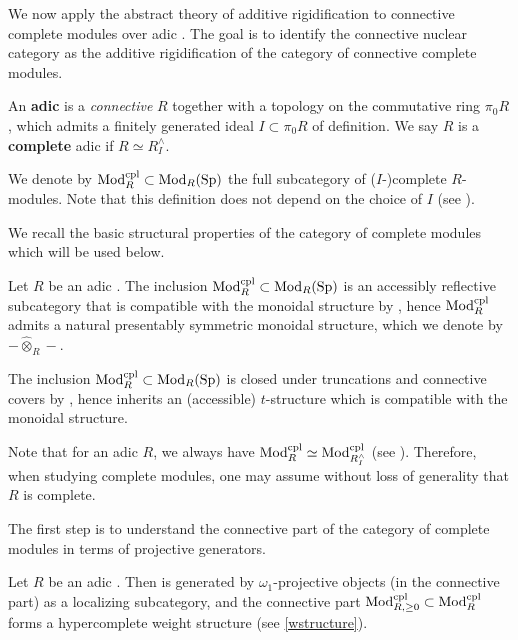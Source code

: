 \documentclass[a4paper,10pt, oneside]{amsart}
\begin{document}
We now apply the abstract theory of additive rigidification to connective complete modules over adic \einfrings. The goal is to identify the connective nuclear category as the additive rigidification of the  category of connective complete modules.
	\begin{de}
		An \textbf{adic \einfring} is a \emph{connective} \einfring $R$ together with a topology on
		the commutative ring $\pi_0R$, which admits a finitely generated ideal $I\subset \pi_0R$ of definition. We say $R$ is a \textbf{complete}  adic \einfring if $R\simeq R^\wedge_I$.
		
	We denote by $\mathrm{Mod}_{R}^{\mathrm{cpl}} \subset \operatorname{Mod}_R(\mathrm{Sp})$ the full subcategory of ($I$-)complete $R$-modules. Note that this definition does not depend on the choice of $I$ (see \cite[Remark 7.3.1.2]{sag}).
	\end{de}
	We recall the basic structural properties of the category of complete modules which will be used below.
	\begin{rem}
		Let $R$ be an adic \einfring. The inclusion $\mathrm{Mod}_{R}^{\mathrm{cpl}}\subset \operatorname{Mod}_R(\mathrm{Sp})$ is an accessibly reflective subcategory that is compatible with the monoidal structure by \cite[.5]{sag}, hence $\mathrm{Mod}_{R}^{\mathrm{cpl}}$ admits a natural presentably symmetric monoidal structure, which we denote by $-\widehat{\otimes}_R -$.
		
		The inclusion $\mathrm{Mod}_{R}^{\mathrm{cpl}}\subset \operatorname{Mod}_R(\mathrm{Sp})$ is  closed under truncations and connective covers by \cite[Proposition 7.3.4.4]{sag}, hence \modrcpl inherits an (accessible) $t$-structure which is compatible with the monoidal structure.
	\end{rem}
	\begin{rem}\label{withoutlosscomplete}
		Note that for an adic \einfring $R$, we always have $\mathrm{Mod}_{R}^{\mathrm{cpl}}\simeq \operatorname{Mod}_{R^\wedge_I}^{\mathrm{cpl}}$ (see \cite[Lemma 2.4.13]{gregoric2021moduli}). Therefore, when studying complete modules, one may assume without loss of generality that $R$ is complete.
	\end{rem}
	The first step is to understand the connective part of the category of complete modules in terms of projective generators.
	\begin{prop}\label{wstructureonmodrcpl}
		Let $R$ be an adic \einfring. Then \modrcpl is generated by $\omega_1$-projective objects (in the connective part) as a localizing subcategory, and the connective part $\mathrm{Mod}_{R,\geq 0}^{\mathrm{cpl}} \subset\mathrm{Mod}_{R}^{\mathrm{cpl}}$ forms a hypercomplete weight structure (see \cref{wstructure}). 
	\end{prop}
\end{document}
